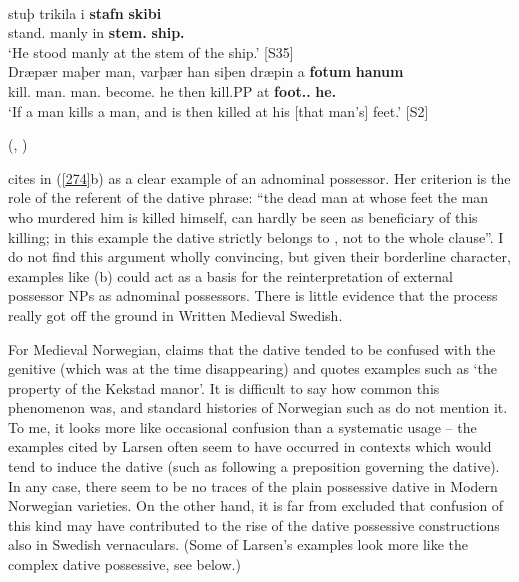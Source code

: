 {\ea\label{}
	\ea 
		\\
		\gll stuþ  trikila  i  \textbf{stafn} \textbf{skibi}\\
		stand.{\pst}  manly  in  \textbf{stem.{\dat}} \textbf{ship.{\dat}}\\
		\glt ‘He stood manly at the stem of the ship.’ [S35]
	\ex 
		\\
		\gll Dræpær  maþer  man, varþær  han  siþen  dræpin  a  \textbf{fotum} \textbf{hanum}\\
		kill.{\prs}  man.{\nom}  man.{\acc} become.{\prs}  he  then  kill.PP  at  \textbf{foot.{\dat}.{\pl}} \textbf{he.{\dat}}\\
		\glt ‘If a man kills a man, and is then killed at his [that man’s] feet.’ [S2]
	\z 
\z

(\citet[15]{Wessén1956}, \citet[211]{Norde1997})

\citet[212]{Norde1997} cites in (\ref{274}b) as a clear example of an adnominal possessor. Her criterion is the role of the referent of the dative phrase: “the dead man at whose feet the man who murdered him is killed himself, can hardly be seen as beneficiary of this killing; in this example the dative  strictly belongs to , not to the whole clause”. I do not find this argument wholly convincing, but given their borderline character, examples like (b) could act as a basis for the reinterpretation of external possessor NPs as adnominal possessors. There is little evidence that the process really got off the ground in Written Medieval Swedish.

For Medieval Norwegian, \citet{Larsen1895} claims that the dative tended to be confused with the genitive (which was at the time disappearing) and quotes examples such as  ‘the property of the Kekstad manor’. It is difficult to say how common this phenomenon was, and standard histories of Norwegian such as \citet{SaltveitEtAl1971} do not mention it. To me, it looks more like occasional confusion than a systematic usage – the examples cited by Larsen often seem to have occurred in contexts which would tend to induce the dative (such as following a preposition governing the dative). In any case, there seem to be no traces of the plain possessive dative in Modern Norwegian varieties. On the other hand, it is far from excluded that confusion of this kind may have contributed to the rise of the dative possessive constructions also in Swedish vernaculars. (Some of Larsen’s examples look more like the complex dative possessive, see below.)

}
